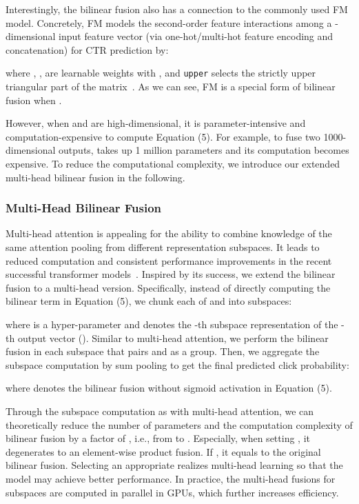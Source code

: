 \documentclass[letterpaper]{article} \usepackage{aaai23}  \usepackage{times}  \usepackage{helvet}  \usepackage{courier}  \usepackage[hyphens]{url}  \usepackage{graphicx} \urlstyle{rm} \def\UrlFont{\rm}  \usepackage{natbib}  \usepackage{caption} \frenchspacing  \setlength{\pdfpagewidth}{8.5in}  \setlength{\pdfpageheight}{11in}  \usepackage{algorithm}
\begin{document}
Interestingly, the bilinear fusion also has a connection to the commonly used FM model. Concretely, FM models the second-order feature interactions among a -dimensional input feature vector  (via one-hot/multi-hot feature encoding and concatenation) for CTR prediction by:

where , ,  are learnable weights with , and \texttt{upper} selects the strictly upper triangular part of the matrix~\cite{FM}. As we can see, FM is a special form of bilinear fusion when .

However, when  and  are high-dimensional, it is parameter-intensive and computation-expensive to compute Equation (5). For example, to fuse two 1000-dimensional outputs,  takes up 1 million parameters and its computation becomes expensive. To reduce the computational complexity, we introduce our extended multi-head bilinear fusion in the following.



\subsubsection{Multi-Head Bilinear Fusion} 
Multi-head attention is appealing for the ability to combine knowledge of the same attention pooling from different representation subspaces. It leads to reduced computation and consistent performance improvements in the recent successful transformer models~\cite{Transformer}. Inspired by its success, we extend the bilinear fusion to a multi-head version. Specifically, instead of directly computing the bilinear term in Equation (5), we chunk each of  and  into  subspaces:

where  is a hyper-parameter and  denotes the -th subspace representation of the -th output vector (). Similar to multi-head attention, we perform the bilinear fusion in each subspace that pairs  and  as a group. Then, we aggregate the subspace computation by sum pooling to get the final predicted click probability:

where  denotes the bilinear fusion without sigmoid activation in Equation (5).





Through the subspace computation as with multi-head attention, we can theoretically reduce the number of parameters and the computation complexity of bilinear fusion by a factor of , i.e., from  to . Especially, when setting , it degenerates to an element-wise product fusion.
If , it equals to the original bilinear fusion. Selecting an appropriate  realizes multi-head learning so that the model may achieve better performance. In practice, the multi-head fusions for  subspaces are computed in parallel in GPUs, which further increases efficiency.
\end{document}
